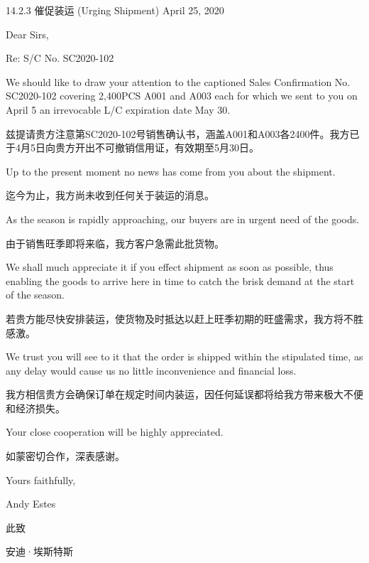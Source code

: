 \documentclass[12pt]{beamer}
\begin{document}
\begin{frame}[allowframebreaks]{14.2.3 催促装运 (Urging Shipment)}
    \textcolor{myblue}{April 25, 2020}
    
    \textcolor{myblue}{Dear Sirs,}
    
    \textcolor{myblue}{Re: S/C No. SC2020-102}
    
    \vspace{0.2cm}
    \textcolor{myblue}{We should like to draw your attention to the captioned Sales Confirmation No. SC2020-102 covering 2,400PCS A001 and A003 each for which we sent to you on April 5 an irrevocable L/C expiration date May 30.}
    
    \textcolor{myred}{兹提请贵方注意第SC2020-102号销售确认书，涵盖A001和A003各2400件。我方已于4月5日向贵方开出不可撤销信用证，有效期至5月30日。}
    
    \vspace{0.2cm}
    \textcolor{myblue}{Up to the present moment no news has come from you about the shipment.}
    
    \textcolor{myred}{迄今为止，我方尚未收到任何关于装运的消息。}
    
    \framebreak
    
    \textcolor{myblue}{As the season is rapidly approaching, our buyers are in urgent need of the goods.}
    
    \textcolor{myred}{由于销售旺季即将来临，我方客户急需此批货物。}
    
    \vspace{0.2cm}
    \textcolor{myblue}{We shall much appreciate it if you effect shipment as soon as possible, thus enabling the goods to arrive here in time to catch the brisk demand at the start of the season.}
    
    \textcolor{myred}{若贵方能尽快安排装运，使货物及时抵达以赶上旺季初期的旺盛需求，我方将不胜感激。}
    
    \vspace{0.2cm}
    \textcolor{myblue}{We trust you will see to it that the order is shipped within the stipulated time, as any delay would cause us no little inconvenience and financial loss.}
    
    \textcolor{myred}{我方相信贵方会确保订单在规定时间内装运，因任何延误都将给我方带来极大不便和经济损失。}
    
    \framebreak
    
    \textcolor{myblue}{Your close cooperation will be highly appreciated.}
    
    \textcolor{myred}{如蒙密切合作，深表感谢。}
    
    \vspace{0.2cm}
    \textcolor{myblue}{Yours faithfully,}
    
    \textcolor{myblue}{Andy Estes}
    
    \textcolor{myred}{此致}
    
    \textcolor{myred}{安迪·埃斯特斯}
    \end{frame}
\end{document}
